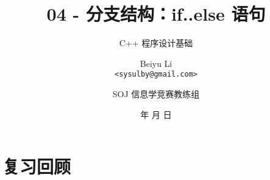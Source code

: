 \title[04 - 分支结构：if..else 语句]
{04 - 分支结构：if..else 语句}

\subtitle{C++ 程序设计基础}

\author[Beiyu Li]
{Beiyu Li\\
\texttt{<sysulby@gmail.com>}}


\date[\today]
{\number\year 年 \number\month 月 \number\day 日}




\author[sysulby]
{SOJ 信息学竞赛教练组}

\begin{frame}
    \titlepage
\end{frame}
\setcounter{framenumber}{0} %


\section{复习回顾}

